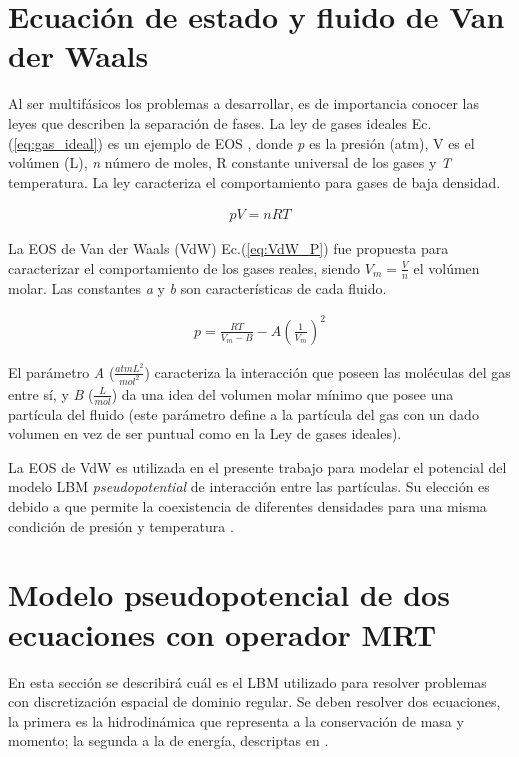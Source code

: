 \section{Ecuación de estado y fluido de Van der Waals}

Al ser multifásicos los problemas a desarrollar, es de importancia conocer las leyes que describen la separación de fases. La ley de gases ideales Ec. (\ref{eq:gas_ideal}) es un ejemplo de EOS , donde \textit{p} es la presión (atm), V es el volúmen (L), \textit{n} número de moles, R constante universal de los gases y \textit{T} temperatura. La ley caracteriza el comportamiento para gases de baja densidad.

\begin{align}
p V = n R T
\label{eq:gas_ideal}
\end{align}

La EOS de Van der Waals (VdW) Ec.(\ref{eq:VdW_P}) fue propuesta para caracterizar el comportamiento de los gases reales, siendo $V_m = \frac{V}{n}$ el volúmen molar. Las constantes \textit{a} y \textit{b} son características de cada fluido.

\begin{align}
p = \frac{R T}{V_m - B} - A {\left(\frac{1}{V_m}\right)}^2
\label{eq:VdW_P}
\end{align}

El parámetro \textit{A}  ($\frac{atm L^2}{mol^2}$) caracteriza la interacción que poseen las moléculas del gas entre sí, y \textit{B} ($\frac{L}{mol}$) da una idea del volumen molar mínimo que posee una partícula del fluido (este parámetro define a la partícula del gas con un dado volumen en vez de ser puntual como en la Ley de gases ideales).

La EOS de VdW es utilizada en el presente trabajo para modelar el potencial del modelo LBM \textit{pseudopotential} de interacción entre las partículas. Su elección es debido a que permite la coexistencia de diferentes densidades para una misma condición de presión y temperatura \cite{huang2015multiphase}. 


\section{Modelo pseudopotencial de dos ecuaciones con operador MRT}
\label{sec:LBM_2_ec_MRT}

En esta sección se describirá cuál es el LBM utilizado para resolver problemas con discretización espacial de dominio regular. Se deben resolver dos ecuaciones, la primera es la hidrodinámica que representa a la conservación de masa y momento; la segunda a la de energía, descriptas en \cite{fogliatto2019transferencia}.


